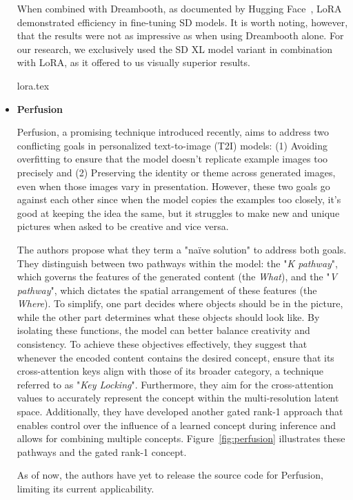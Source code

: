 \begin{itemize}
When combined with Dreambooth, as documented by Hugging Face~\cite{loraGuideFinetuning}, LoRA demonstrated efficiency in fine-tuning SD models. It is worth noting, however, that the results were not as impressive as when using Dreambooth alone. For our research, we exclusively used the SD XL model variant in combination with LoRA, as it offered to us visually superior results.

{lora.tex}
    
    \item \textbf{Perfusion}~\cite{tewel2023keylocked} 
    
Perfusion, a promising technique introduced recently, aims to address two conflicting goals in personalized text-to-image (T2I) models: (1) Avoiding overfitting to ensure that the model doesn't replicate example images too precisely and (2) Preserving the identity or theme across generated images, even when those images vary in presentation. However, these two goals go against each other since when the model copies the examples too closely, it's good at keeping the idea the same, but it struggles to make new and unique pictures when asked to be creative and vice versa.

The authors propose what they term a "naïve solution" to address both goals. They distinguish between two pathways within the model: the "\textit{K pathway}", which governs the features of the generated content (the \textit{What}), and the "\textit{V pathway}", which dictates the spatial arrangement of these features (the \textit{Where}). To simplify, one part decides where objects should be in the picture, while the other part determines what these objects should look like. By isolating these functions, the model can better balance creativity and consistency. To achieve these objectives effectively, they suggest that whenever the encoded content contains the desired concept, ensure that its cross-attention keys align with those of its broader category, a technique referred to as "\textit{Key Locking}". Furthermore, they aim for the cross-attention values to accurately represent the concept within the multi-resolution latent space. Additionally, they have developed another gated rank-1 approach that enables control over the influence of a learned concept during inference and allows for combining multiple concepts. Figure~\ref{fig:perfusion} illustrates these pathways and the gated rank-1 concept.

As of now, the authors have yet to release the source code for Perfusion, limiting its current applicability.


\end{itemize}
